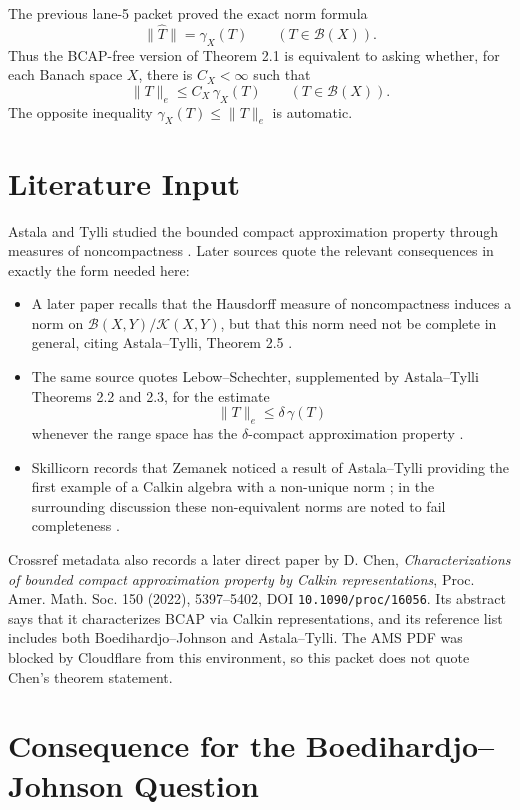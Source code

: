 \documentclass[11pt]{article}
\newcommand{\B}{\mathcal B}
\newcommand{\K}{\mathcal K}
\newcommand{\wh}{\widehat}
\begin{document}
The previous lane-5 packet proved the exact norm formula
\[
  \|\wh T\|=\gamma_X(T) \qquad (T\in\B(X)).
\]
Thus the BCAP-free version of Theorem 2.1 is equivalent to asking whether, for
each Banach space \(X\), there is \(C_X<\infty\) such that
\[
  \|T\|_e\le C_X\,\gamma_X(T) \qquad (T\in\B(X)).
\]
The opposite inequality \(\gamma_X(T)\le \|T\|_e\) is automatic.

\section*{Literature Input}

Astala and Tylli studied the bounded compact approximation property through
measures of noncompactness \cite{AT}.  Later sources quote the relevant
consequences in exactly the form needed here:

\begin{itemize}
\item A later paper recalls that the Hausdorff measure of noncompactness
  induces a norm on \(\B(X,Y)/\K(X,Y)\), but that this norm need not be
  complete in general, citing Astala--Tylli, Theorem 2.5
  \cite[Subsection ``Measures of non-compactness'']{Kothe}.
\item The same source quotes Lebow--Schechter, supplemented by
  Astala--Tylli Theorems 2.2 and 2.3, for the estimate
  \[
    \|T\|_e\le \delta\,\gamma(T)
  \]
  whenever the range space has the \(\delta\)-compact approximation property
  \cite[Subsection ``Measures of non-compactness'']{Kothe}.
\item Skillicorn records that Zemanek noticed a result of Astala--Tylli
  providing the first example of a Calkin algebra with a non-unique norm
  \cite[Section 1]{Skillicorn}; in the surrounding discussion these
  non-equivalent norms are noted to fail completeness
  \cite[Section 1]{Skillicorn}.
\end{itemize}

Crossref metadata also records a later direct paper by D. Chen,
\emph{Characterizations of bounded compact approximation property by Calkin
representations}, Proc. Amer. Math. Soc. 150 (2022), 5397--5402,
DOI \texttt{10.1090/proc/16056}.  Its abstract says that it characterizes BCAP
via Calkin representations, and its reference list includes both
Boedihardjo--Johnson and Astala--Tylli.  The AMS PDF was blocked by Cloudflare
from this environment, so this packet does not quote Chen's theorem statement.

\section*{Consequence for the Boedihardjo--Johnson Question}
\end{document}
